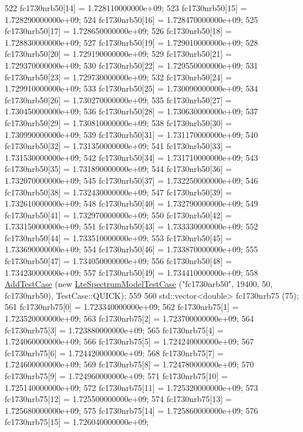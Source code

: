 \begin{DoxyCode}
522   fc1730nrb50[14] = 1.728110000000e+09;
523   fc1730nrb50[15] = 1.728290000000e+09;
524   fc1730nrb50[16] = 1.728470000000e+09;
525   fc1730nrb50[17] = 1.728650000000e+09;
526   fc1730nrb50[18] = 1.728830000000e+09;
527   fc1730nrb50[19] = 1.729010000000e+09;
528   fc1730nrb50[20] = 1.729190000000e+09;
529   fc1730nrb50[21] = 1.729370000000e+09;
530   fc1730nrb50[22] = 1.729550000000e+09;
531   fc1730nrb50[23] = 1.729730000000e+09;
532   fc1730nrb50[24] = 1.729910000000e+09;
533   fc1730nrb50[25] = 1.730090000000e+09;
534   fc1730nrb50[26] = 1.730270000000e+09;
535   fc1730nrb50[27] = 1.730450000000e+09;
536   fc1730nrb50[28] = 1.730630000000e+09;
537   fc1730nrb50[29] = 1.730810000000e+09;
538   fc1730nrb50[30] = 1.730990000000e+09;
539   fc1730nrb50[31] = 1.731170000000e+09;
540   fc1730nrb50[32] = 1.731350000000e+09;
541   fc1730nrb50[33] = 1.731530000000e+09;
542   fc1730nrb50[34] = 1.731710000000e+09;
543   fc1730nrb50[35] = 1.731890000000e+09;
544   fc1730nrb50[36] = 1.732070000000e+09;
545   fc1730nrb50[37] = 1.732250000000e+09;
546   fc1730nrb50[38] = 1.732430000000e+09;
547   fc1730nrb50[39] = 1.732610000000e+09;
548   fc1730nrb50[40] = 1.732790000000e+09;
549   fc1730nrb50[41] = 1.732970000000e+09;
550   fc1730nrb50[42] = 1.733150000000e+09;
551   fc1730nrb50[43] = 1.733330000000e+09;
552   fc1730nrb50[44] = 1.733510000000e+09;
553   fc1730nrb50[45] = 1.733690000000e+09;
554   fc1730nrb50[46] = 1.733870000000e+09;
555   fc1730nrb50[47] = 1.734050000000e+09;
556   fc1730nrb50[48] = 1.734230000000e+09;
557   fc1730nrb50[49] = 1.734410000000e+09;
558   \hyperlink{classns3_1_1TestCase_a3718088e3eefd5d6454569d2e0ddd835}{AddTestCase} (\textcolor{keyword}{new} \hyperlink{classLteSpectrumModelTestCase}{LteSpectrumModelTestCase} (\textcolor{stringliteral}{"fc1730nrb50"}, 19400, 50, 
      fc1730nrb50), TestCase::QUICK);
559 
560   std::vector<double> fc1730nrb75 (75);
561   fc1730nrb75[0] = 1.723340000000e+09;
562   fc1730nrb75[1] = 1.723520000000e+09;
563   fc1730nrb75[2] = 1.723700000000e+09;
564   fc1730nrb75[3] = 1.723880000000e+09;
565   fc1730nrb75[4] = 1.724060000000e+09;
566   fc1730nrb75[5] = 1.724240000000e+09;
567   fc1730nrb75[6] = 1.724420000000e+09;
568   fc1730nrb75[7] = 1.724600000000e+09;
569   fc1730nrb75[8] = 1.724780000000e+09;
570   fc1730nrb75[9] = 1.724960000000e+09;
571   fc1730nrb75[10] = 1.725140000000e+09;
572   fc1730nrb75[11] = 1.725320000000e+09;
573   fc1730nrb75[12] = 1.725500000000e+09;
574   fc1730nrb75[13] = 1.725680000000e+09;
575   fc1730nrb75[14] = 1.725860000000e+09;
576   fc1730nrb75[15] = 1.726040000000e+09;

\end{DoxyCode}
